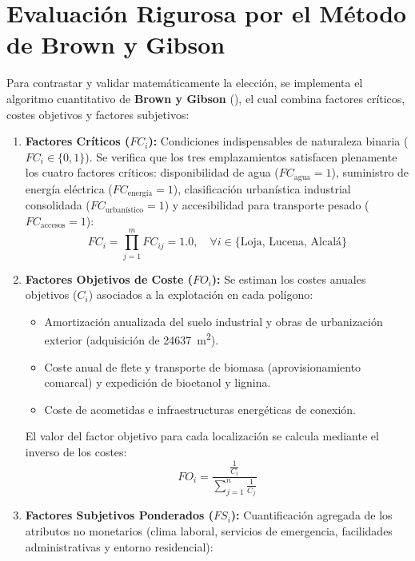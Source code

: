 \documentclass{report}
\begin{document}
\section{Evaluación Rigurosa por el Método de Brown y Gibson}
Para contrastar y validar matemáticamente la elección, se implementa el algoritmo cuantitativo de \textbf{Brown y Gibson} (\textcite{PetersTimmerhaus2003}), el cual combina factores críticos, costes objetivos y factores subjetivos:
\begin{enumerate}
    \item \textbf{Factores Críticos ($FC_i$):} Condiciones indispensables de naturaleza binaria ($FC_i \in \{0, 1\}$). Se verifica que los tres emplazamientos satisfacen plenamente los cuatro factores críticos: disponibilidad de agua ($FC_{\text{agua}} = 1$), suministro de energía eléctrica ($FC_{\text{energía}} = 1$), clasificación urbanística industrial consolidada ($FC_{\text{urbanístico}} = 1$) y accesibilidad para transporte pesado ($FC_{\text{accesos}} = 1$):
          \begin{equation}
              FC_i = \prod_{j=1}^m FC_{ij} = 1.0, \quad \forall i \in \{\text{Loja, Lucena, Alcalá}\}
          \end{equation}
    \item \textbf{Factores Objetivos de Coste ($FO_i$):} Se estiman los costes anuales objetivos ($C_i$) asociados a la explotación en cada polígono:
          \begin{itemize}
              \item Amortización anualizada del suelo industrial y obras de urbanización exterior (adquisición de \SI{24637}{\square\metre}).
              \item Coste anual de flete y transporte de biomasa (aprovisionamiento comarcal) y expedición de bioetanol y lignina.
              \item Coste de acometidas e infraestructuras energéticas de conexión.
          \end{itemize}
          El valor del factor objetivo para cada localización se calcula mediante el inverso de los costes:
          \begin{equation}
              FO_i = \frac{\frac{1}{C_i}}{\sum_{j=1}^n \frac{1}{C_j}}
          \end{equation}
    \item \textbf{Factores Subjetivos Ponderados ($FS_i$):} Cuantificación agregada de los atributos no monetarios (clima laboral, servicios de emergencia, facilidades administrativas y entorno residencial):

\end{enumerate}
\end{document}
